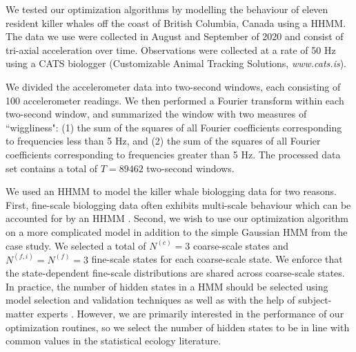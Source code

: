 
We tested our optimization algorithms by modelling the behaviour of eleven resident killer whales off the coast of British Columbia, Canada using a HHMM. The data we use were collected in August and September of 2020 and consist of tri-axial acceleration over time. Observations were collected at a rate of 50 Hz using a CATS biologger (Customizable Animal Tracking Solutions, {\em{www.cats.is}}).


We divided the accelerometer data into two-second windows, each consisting of 100 accelerometer readings. We then performed a Fourier transform within each two-second window, and summarized the window with two measures of ``wiggliness":
(1) the sum of the squares of all Fourier coefficients corresponding to frequencies less than 5 Hz, and (2) the sum of the squares of all Fourier coefficients corresponding to frequencies greater than 5 Hz. The processed data set contains a total of $T=89462$ two-second windows.

We used an HHMM \citep{Barajas:2017} to model the killer whale biologging data for two reasons. First, fine-scale biologging data often exhibits multi-scale behaviour which can be accounted for by an HHMM \citep{Sidrow:2021}. Second, we wish to use our optimization algorithm on a more complicated model in addition to the simple Gaussian HMM from the case study. We selected a total of $N^{(c)} = 3$ coarse-scale states and $N^{(f,i)} = N^{(f)} = 3$ fine-scale states for each coarse-scale state. We enforce that the state-dependent fine-scale distributions are shared across coarse-scale states. In practice, the number of hidden states in a HMM should be selected using model selection and validation techniques as well as with the help of subject-matter experts \citep{Pohle:2017}. However, we are primarily interested in the performance of our optimization routines, so we select the number of hidden states to be in line with common values in the statistical ecology literature. 

